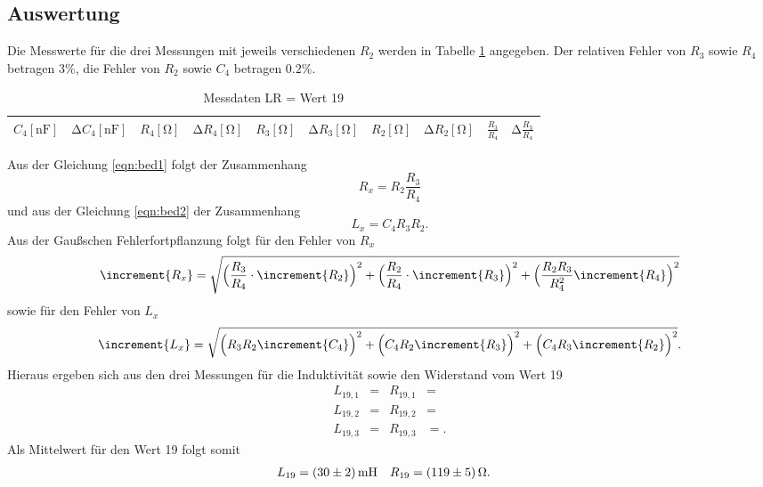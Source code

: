 \subsection{Auswertung}
Die Messwerte für die drei Messungen mit jeweils verschiedenen $R_2$ werden in Tabelle \ref{tab:7} angegeben.
Der relativen Fehler von $R_3$ sowie $R_4$ betragen $3\%$, die Fehler von $R_2$ sowie $C_4$ betragen $0.2\%$. \cite{sample}
\begin{table}
  \centering
  \caption{Messdaten LR = Wert 19}
  \label{tab:7}
  \begin{tabular}{c c c c c c c c c c}
    \toprule
    {$C_4 [\si{\nano\farad}]$} & {$\increment C_4 [\si{\nano\farad}]$} & {$R_4 [\si{\ohm}]$} & {$\increment R_4 [\si{\ohm}]$} & {$R_3 [\si{\ohm}]$} & {$\increment R_3 [\si{\ohm}]$} & {$R_2 [\si{\ohm}]$} & {$\increment R_2 [\si{\ohm}]$} & {$\frac{R_3}{R_4}$} & {$\increment \frac{R_3}{R_4}$} \\
    \midrule
    
    \bottomrule
  \end{tabular}
\end{table}
Aus der Gleichung \ref{eqn:bed1} folgt der Zusammenhang
\begin{equation}
  R_x = R_2 \frac{R_3}{R_4}
\end{equation}
und aus der Gleichung \ref{eqn:bed2} der Zusammenhang
\begin{equation}
  L_x = C_4R_3R_2.
\end{equation}
Aus der Gaußschen Fehlerfortpflanzung folgt für den Fehler von $R_x$
\begin{equation}
\increment{R_x} = \sqrt{\Bigl( \frac{R_3}{R_4} \cdot \increment{R_2} \Bigr)^2 + \Bigl( \frac{R_2}{R_4} \cdot \increment{R_3}\Bigr)^2 + \Bigl( \frac{R_2 R_3}{R_4^2} \increment{R_4} \Bigr)^2}
  \label{eqn:fehler1}
\end{equation}
sowie für den Fehler von $L_x$
\begin{equation}
\increment{L_x} = \sqrt{\Bigl( R_3 R_2 \increment{C_4} \Bigr)^2 + \Bigl( C_4 R_2 \increment{R_3} \Bigr)^2 + \Bigl( C_4 R_3 \increment{R_2} \Bigr)^2}.
  \label{eqn:fehler1}
\end{equation}
Hieraus ergeben sich aus den drei Messungen für die Induktivität sowie den Widerstand vom Wert 19
\begin{align*}
  L_{19,1}   &=  & R_{19,1} &= \\
  L_{19,2}   &=  & R_{19,2} &= \\
  L_{19,3}   &=  & R_{19,3} &= .
\end{align*}
Als Mittelwert für den Wert 19 folgt somit
\begin{align*}
  L_{19}   &= \SI{30 +- 2}{\milli\henry} & R_{19} &= \SI{119 +- 5}{\ohm}.
\end{align*}

